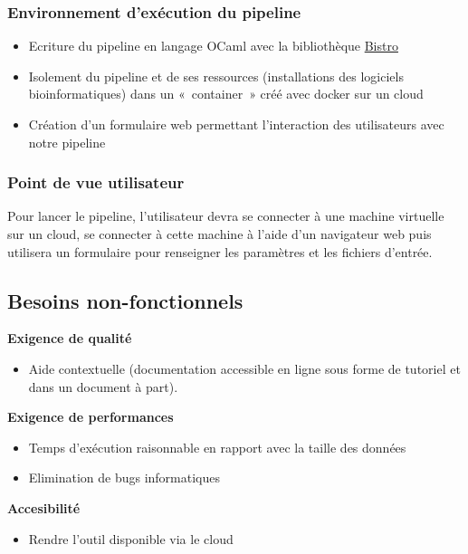 \subsubsection{Environnement d'exécution du pipeline}

\begin{itemize}
\setlength{\itemindent}{.2in}
\item Ecriture du pipeline en langage OCaml avec la bibliothèque \href{https://github.com/pveber/bistro}{Bistro}
\item Isolement du pipeline et de ses ressources (installations des logiciels bioinformatiques) dans 	un « container » créé avec docker sur un cloud
\item Création d'un formulaire web permettant l'interaction des utilisateurs avec notre pipeline
\end{itemize}

\subsubsection{Point de vue utilisateur}

Pour lancer le pipeline, l’utilisateur devra se connecter à une machine virtuelle sur un cloud, se connecter à cette machine à l’aide d’un navigateur web puis utilisera un formulaire pour renseigner les paramètres et les fichiers d’entrée. 

\subsection{Besoins non-fonctionnels}

\textbf{Exigence de qualité}

\begin{itemize}
\setlength{\itemindent}{.2in}
\item Aide contextuelle (documentation accessible en ligne sous forme de tutoriel et dans un document à part).
\end{itemize}

\textbf{Exigence de performances}

\begin{itemize}
\setlength{\itemindent}{.2in}
\item Temps d’exécution raisonnable en rapport avec la taille des données
\item Elimination de bugs informatiques
\end{itemize}

\textbf{Accesibilité}

\begin{itemize}
\setlength{\itemindent}{.2in}
\item Rendre l'outil disponible via le cloud 
\end{itemize}

